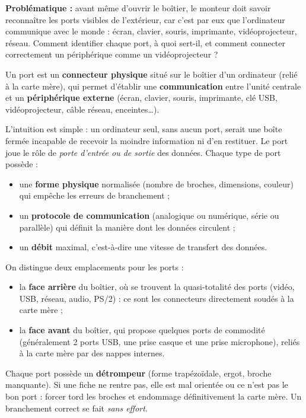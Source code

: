 \documentclass[11pt]{article}
\newcommand{\cle}[1]{{\popxbold\color{popdark}#1}}
\newcounter{popsec}
\newcounter{popsub}
\newcommand{\courssub}[1]{%
  \stepcounter{popsub}%
  \par\vspace{9pt}\noindent{\popxbold\fontsize{11.5}{13}\selectfont\color{popink}{\color{poporange}\thepopsec.\thepopsub}\hspace{6pt}#1}\par\nopagebreak\vspace{4pt}
}
\begin{document}
\textbf{Problématique :} avant même d'ouvrir le boîtier, le monteur doit savoir reconnaître les \cle{ports} visibles de l'extérieur, car c'est par eux que l'ordinateur communique avec le monde : écran, clavier, souris, imprimante, vidéoprojecteur, réseau. Comment identifier chaque port, à quoi sert-il, et comment connecter correctement un périphérique comme un vidéoprojecteur ?

\courssub{Notion de port}

\begin{definition}[Port]
Un \cle{port} est un \textbf{connecteur physique} situé sur le boîtier d'un ordinateur (relié à la carte mère), qui permet d'établir une \textbf{communication} entre l'unité centrale et un \textbf{périphérique externe} (écran, clavier, souris, imprimante, clé USB, vidéoprojecteur, câble réseau, enceintes\ldots).
\end{definition}

L'intuition est simple : un ordinateur seul, sans aucun port, serait une boîte fermée incapable de recevoir la moindre information ni d'en restituer. Le port joue le rôle de \emph{porte d'entrée ou de sortie} des données. Chaque type de port possède :
\begin{itemize}
  \item une \textbf{forme physique} normalisée (nombre de broches, dimensions, couleur) qui empêche les erreurs de branchement ;
  \item un \textbf{protocole de communication} (analogique ou numérique, série ou parallèle) qui définit la manière dont les données circulent ;
  \item un \textbf{débit} maximal, c'est-à-dire une vitesse de transfert des données.
\end{itemize}

On distingue deux emplacements pour les ports :
\begin{itemize}
  \item la \textbf{face arrière} du boîtier, où se trouvent la quasi-totalité des ports (vidéo, USB, réseau, audio, PS/2) : ce sont les connecteurs directement soudés à la carte mère ;
  \item la \textbf{face avant} du boîtier, qui propose quelques ports de commodité (généralement 2 ports USB, une prise casque et une prise microphone), reliés à la carte mère par des nappes internes.
\end{itemize}

\begin{attention}
Chaque port possède un \textbf{détrompeur} (forme trapézoïdale, ergot, broche manquante). Si une fiche ne rentre pas, elle est mal orientée ou ce n'est pas le bon port : forcer tord les broches et endommage définitivement la carte mère. Un branchement correct se fait \emph{sans effort}.
\end{attention}
\end{document}
